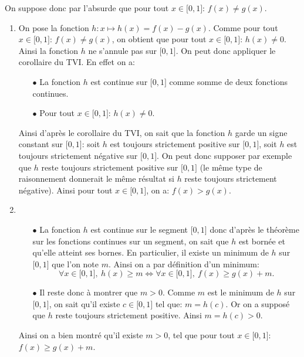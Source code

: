 \documentclass[a4paper, 11pt,reqno]{article}
\begin{document}
\begin{correction}  \;
	On suppose donc par l'absurde que pour tout $x\in\lbrack 0,1\rbrack$: $f(x)\not= g(x)$.
	\begin{enumerate}
		\item On pose la fonction $h: x\mapsto h(x)=f(x)-g(x)$. Comme pour tout $x\in\lbrack 0,1\rbrack$: $f(x)\not= g(x)$, on obtient que pour tout $x\in\lbrack 0,1\rbrack$: $h(x)\not= 0$. Ainsi la fonction $h$ ne s'annule pas sur $\lbrack 0,1\rbrack$. On peut donc appliquer le corollaire du TVI. En effet on a:
		      \begin{itemize}
			      \item[$\bullet$] La fonction $h$ est continue sur $\lbrack 0,1\rbrack$ comme somme de deux fonctions continues.
			      \item[$\bullet$] Pour tout $x\in\lbrack 0,1\rbrack$: $h(x)\not= 0$.
		      \end{itemize}
		      Ainsi d'apr\`{e}s le corollaire du TVI, on sait que la fonction $h$ garde un signe constant sur $\lbrack 0,1\rbrack$: soit $h$ est toujours strictement positive sur $\lbrack 0,1\rbrack$, soit $h$ est toujours strictement n\'egative sur $\lbrack 0,1\rbrack$. On peut donc supposer par exemple que $h$ reste toujours strictement positive sur $\lbrack 0,1\rbrack$ (le m\^{e}me type de raisonnement donnerait le m\^{e}me r\'esultat si $h$ reste toujours strictement n\'egative). Ainsi pour tout $x\in\lbrack 0,1\rbrack$, on a: $f(x)>g(x)$.
		\item
		      \begin{itemize}
			      \item[$\bullet$] La fonction $h$ est continue sur le segment $\lbrack 0,1\rbrack$ donc d'apr\`{e}s le th\'eor\`{e}me sur les fonctions continues sur un segment, on sait que $h$ est born\'ee et qu'elle atteint ses bornes. En particulier, il existe un minimum de $h$ sur $\lbrack 0,1\rbrack$ que l'on note $m$. Ainsi on a par d\'efinition d'un minimum:
			            $$\forall x\in\lbrack 0,1\rbrack,\ h(x)\geq m\Leftrightarrow   \forall x\in\lbrack 0,1\rbrack,\ f(x)\geq g(x)+m.$$
			      \item[$\bullet$] Il reste donc \`{a} montrer que $m>0$. Comme $m$ est le minimum de $h$ sur $\lbrack 0,1\rbrack$, on sait qu'il existe $c\in\lbrack 0,1\rbrack$ tel que: $m=h(c)$. Or on a suppos\'e que $h$ reste toujours strictement positive. Ainsi $m=h(c)>0$.
		      \end{itemize}
		      Ainsi on a bien montr\'e qu'il existe $m>0$, tel que pour tout $x\in\lbrack 0,1\rbrack$: $f(x)\geq g(x)+m$.

\end{enumerate}
\end{correction}
\end{document}
